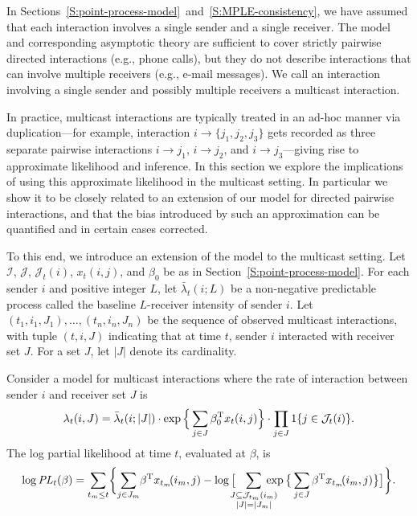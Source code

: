 \documentclass[final]{statsoc}
\begin{document}
In Sections~\ref{S:point-process-model}~and~\ref{S:MPLE-consistency},
we have assumed that each interaction involves a single sender and a single
receiver.  The model and corresponding asymptotic theory are sufficient to
cover strictly pairwise directed interactions (e.g., phone calls), but they
do not describe interactions that can involve multiple receivers (e.g.,
e-mail messages).  We call an interaction involving a single sender and
possibly multiple receivers a multicast interaction.

In practice, multicast interactions are typically treated in an ad-hoc manner
via duplication---for example, interaction $i \to \{ j_1, j_2, j_3 \}$ gets
recorded as three separate pairwise interactions $i \to j_1$, $i \to j_2$,
and $i \to j_3$---giving rise to approximate likelihood and inference.
In this section we explore the implications of using this approximate
likelihood in the multicast setting.  In particular we show it to be closely
related to an extension of our model for directed pairwise interactions, and
that the bias introduced by such an approximation can be quantified and in
certain cases corrected.

To this end, we introduce an extension of the model to the multicast setting.
Let $\mathcal{I}$, $\mathcal{J}$, $\mathcal{J}_t(i)$, $x_t(i,j)$,
and $\beta_0$ be as in Section~\ref{S:point-process-model}.  For each sender
$i$ and positive integer $L$, let $\bar \lambda_t(i ; L)$ be a non-negative
predictable process called the baseline $L$-receiver intensity of sender $i$.
Let $(t_1, i_1, J_1), \ldots, (t_n, i_n, J_n)$ be the
sequence of observed multicast interactions, with tuple $(t, i, J)$
indicating that at  time $t$, sender $i$ interacted with receiver set $J$.
For a set $J$, let $|J|$ denote its cardinality.

Consider a model for multicast interactions where the rate of interaction
between sender $i$ and receiver set $J$ is
\begin{equation}\label{E:intensity-multiple}
    \lambda_t(i,J)
        =
        \bar \lambda_t(i ; |J|)
        \cdot
        \exp\Big\{
            \sum_{j \in J}
                \beta_0^{\mathrm{T}}  x_t(i,j)
        \Big\}
        \cdot
        \prod_{j \in J}
        1\{ j \in \mathcal{J}_t(i) \}.
\end{equation}
The log partial likelihood at time $t$, evaluated at $\beta$, is
\begin{equation}\label{E:log-pl-multiple}
    \log
    \mathit{PL}_t(\beta)
        =
        \sum_{t_m \leq t}\!
        \bigg\{\!
            \sum_{j \in J_m}\!
                \beta^\trans x_{t_m}\!(i_m, j)
            -
            \log\big[
                \!\!\!\!
                \sum_{\substack{J \subseteq \mathcal{J}_{t_m}(i_m) \\
                               |J| = |J_m|}}\!\!\!\!\!\!\!
                    \exp\big\{
                        \sum_{j \in J}
                            \beta^\trans x_{t_m}\!(i_m, j)
                    \big\}
            \big]
        \bigg\}.
\end{equation}
\end{document}
